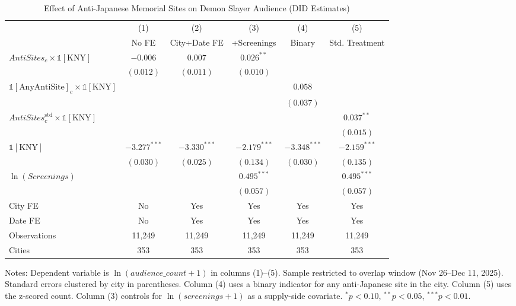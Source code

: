 \documentclass[12pt]{article}
\begin{document}
\begin{table}[H]
\centering
\caption{Effect of Anti-Japanese Memorial Sites on Demon Slayer Audience (DID Estimates)}
\label{tab:mainresults}
\begin{threeparttable}
\setlength{\tabcolsep}{6pt}
\begin{tabular}{lccccc}
\toprule
 & (1) & (2) & (3) & (4) & (5) \\
 & No FE & City+Date FE & +Screenings & Binary & Std. Treatment \\
\midrule
$\textit{AntiSites}_c \times \mathbb{1}[\text{KNY}]$ & $-0.006$ & $0.007$ & $0.026^{**}$ & & \\
 & $(0.012)$ & $(0.011)$ & $(0.010)$ & & \\
\addlinespace
$\mathbb{1}[\text{AnyAntiSite}]_c \times \mathbb{1}[\text{KNY}]$ & & & & $0.058$ & \\
 & & & & $(0.037)$ & \\
\addlinespace
$\textit{AntiSites}^{\text{std}}_c \times \mathbb{1}[\text{KNY}]$ & & & & & $0.037^{**}$ \\
 & & & & & $(0.015)$ \\
\addlinespace
$\mathbb{1}[\text{KNY}]$ & $-3.277^{***}$ & $-3.330^{***}$ & $-2.179^{***}$ & $-3.348^{***}$ & $-2.159^{***}$ \\
 & $(0.030)$ & $(0.025)$ & $(0.134)$ & $(0.030)$ & $(0.135)$ \\
\addlinespace
$\ln(\textit{Screenings})$ & & & $0.495^{***}$ & & $0.495^{***}$ \\
 & & & $(0.057)$ & & $(0.057)$ \\
\addlinespace
City FE & No & Yes & Yes & Yes & Yes \\
Date FE & No & Yes & Yes & Yes & Yes \\
\midrule
Observations & 11,249 & 11,249 & 11,249 & 11,249 & 11,249 \\
Cities & 353 & 353 & 353 & 353 & 353 \\
\bottomrule
\end{tabular}
\begin{tablenotes}
\small
\item Notes: Dependent variable is $\ln(\textit{audience\_count} + 1)$ in columns (1)--(5). Sample restricted to overlap window (Nov 26--Dec 11, 2025). Standard errors clustered by city in parentheses. Column (4) uses a binary indicator for any anti-Japanese site in the city. Column (5) uses the z-scored count. Column (3) controls for $\ln(\textit{screenings}+1)$ as a supply-side covariate. $^{*}p<0.10$, $^{**}p<0.05$, $^{***}p<0.01$.
\end{tablenotes}
\end{threeparttable}
\end{table}
\end{document}

